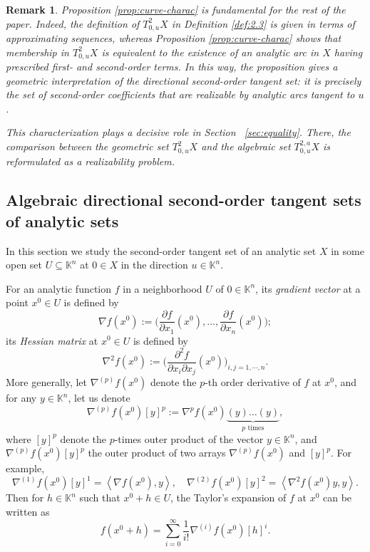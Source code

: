 \documentclass[10pt,reqno]{amsart}
\theoremstyle{break-italic}
\theoremstyle{break-italic}
\theoremstyle{break-italic}
\theoremstyle{break-italic}
\theoremstyle{break-italic}
\theoremstyle{break-italic}
\theoremstyle{break-italic}
\theoremstyle{break-italic}
\theoremstyle{break-roman}
\newtheorem{remark}[satz]{Remark}
\theoremstyle{standard}
\theoremstyle{varthm-roman}
\theoremstyle{varthm-italic}
\theoremstyle{varthm-roman-break}
\theoremstyle{varthm-italic-break}
\theoremstyle{varthm-roman-no-punctuation}
\theoremstyle{varthm-italic-no-punctuation}
\numberwithin{equation}{section}
\newcommand{\seq}[1]{\left<#1\right>}
\begin{document}
\begin{remark}\label{rem:importance-prop-2.6}\rm
Proposition \ref{prop:curve-charac} is fundamental for the rest of the paper. Indeed, the definition
of $T^2_{0,u}X$ in Definition \ref{def:2.3} is given in terms of approximating sequences,
whereas Proposition \ref{prop:curve-charac} shows that membership in $T^2_{0,u}X$ is equivalent to
the existence of an analytic arc in $X$ having prescribed first- and second-order
terms. In this way, the proposition gives a geometric interpretation of the
directional second-order tangent set: it is precisely the set of second-order
coefficients that are realizable by analytic arcs tangent to $u$. 

This characterization plays a decisive role in Section~ \ref{sec:equality}. There, the comparison
between the geometric set $T^2_{0,u}X$ and the algebraic set $T^{2,a}_{0,u}X$
is reformulated as a realizability problem.
\end{remark}


\subsection{Algebraic directional second-order tangent sets of analytic sets}
In this section we study the second-order tangent set  of an analytic set $X$ in some open set $U\subseteq \mathbb K^n$ at $0\in X$ in the direction $u\in \mathbb K^n$.

For an analytic function $f$ in a neighborhood $U$ of $0\in \mathbb K^n$, its \textit{gradient vector } at a point $x^0 \in U$  is defined by 
$$ \nabla f (x^0):= \big(\dfrac{\partial f }{\partial x_1}(x^0), \ldots, \dfrac{\partial f}{\partial x_n}(x^0)\big); $$
its \textit{Hessian matrix} at $x^0 \in U$ is defined by 
$$ \nabla^2 f (x^0):= \big(\dfrac{\partial^2 f }{\partial x_i \partial x_j}(x^0)\big)_{i,j=1,\cdots,n}. $$
More generally, let   $\nabla^{(p)}f(x^0)$ denote the $p$-th order derivative of $f$ at $x^0$, and for any $y\in \mathbb K^n$, let us denote  
$$
 \nabla^{(p)}f(x^0)[y]^p:=\nabla^{p}f(x^0)\underbrace{(y)\ldots (y)}_{ \mbox{$p$ times}},
$$
where $[y]^p$ denote the $p$-times outer product of the vector  $y\in \mathbb K^n$, and $\nabla^{(p)}f(x^0)[y]^p$ the outer product of two arrays $\nabla^{(p)}f(x^0)$ and $[y]^p$. 
For example, 
$$\nabla^{(1)}f(x^0)[y]^1 = \seq{\nabla f(x^0),y}, \quad \nabla^{(2)}f(x^0)[y]^2 = \seq{\nabla^2 f(x^0)y, y}. $$
Then for $h\in \mathbb K^n$ such that $x^0+h \in U$, the Taylor's expansion of $f$ at $x^0$ can be written as
\begin{equation}\label{Taylor}
 f(x^0+h)=\sum_{i=0}^\infty \dfrac{1}{i!}\nabla^{(i)}f(x^0)[h]^i.
\end{equation}
\end{document}
